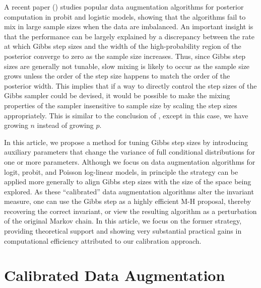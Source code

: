 \documentclass[10pt]{article}
\begin{document}
A recent paper (\cite{johndrow2016inefficiency}) studies popular data augmentation algorithms for posterior computation in probit \citep{albert1993bayesian} and logistic  \citep{polson2013bayesian} models, showing that the algorithms fail to mix in large sample sizes when the data are imbalanced. An important insight is that the performance can be largely explained by a discrepancy between the rate at which Gibbs step sizes and the width of the high-probability region of the posterior converge to zero as the sample size increases. Thus, since Gibbs step sizes are generally not tunable, slow mixing is likely to occur as the sample size grows unless the order of the step size happens to match the order of the posterior width. This implies that if a way to directly control the step sizes of the Gibbs sampler could be devised, it would be possible to make the mixing properties of the sampler insensitive to sample size by scaling the step sizes appropriately. This is similar to the conclusion of \cite{hairer2014spectral}, except in this case, we have growing $n$ instead of growing $p$.

In this article, we propose a method for tuning Gibbs step sizes by introducing auxiliary parameters that change the variance of full conditional distributions for one or more parameters. Although we focus on data augmentation algorithms for logit, probit, and Poisson log-linear models, in principle the strategy can be applied more generally to align Gibbs step sizes with the size of the space being explored. As these ``calibrated'' data augmentation algorithms alter the invariant measure, one can use the Gibbs step as a highly efficient M-H proposal, thereby recovering the correct invariant, or view the resulting algorithm as a perturbation of the original Markov chain.  In this article, we focus on the former strategy, providing theoretical support and showing very substantial practical gains in computational efficiency attributed to our calibration approach.

\section{Calibrated Data Augmentation}
\end{document}
